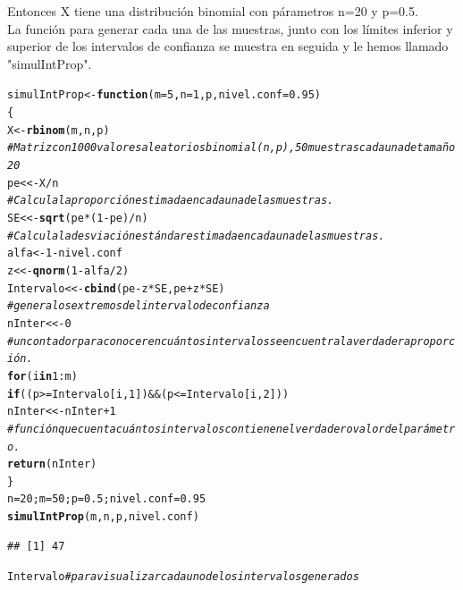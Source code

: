 \documentclass[12pt,letterpaper]{article}\usepackage[]{graphicx}\usepackage[]{color}
\makeatletter
\newcommand{\hlnum}[1]{\textcolor[rgb]{0.686,0.059,0.569}{#1}}%
\newcommand{\hlcom}[1]{\textcolor[rgb]{0.678,0.584,0.686}{\textit{#1}}}%
\newcommand{\hlopt}[1]{\textcolor[rgb]{0,0,0}{#1}}%
\newcommand{\hlstd}[1]{\textcolor[rgb]{0.345,0.345,0.345}{#1}}%
\newcommand{\hlkwa}[1]{\textcolor[rgb]{0.161,0.373,0.58}{\textbf{#1}}}%
\newcommand{\hlkwb}[1]{\textcolor[rgb]{0.69,0.353,0.396}{#1}}%
\newcommand{\hlkwc}[1]{\textcolor[rgb]{0.333,0.667,0.333}{#1}}%
\newcommand{\hlkwd}[1]{\textcolor[rgb]{0.737,0.353,0.396}{\textbf{#1}}}%
\newenvironment{kframe}{%
 \def\at@end@of@kframe{}%
 \ifinner\ifhmode%
  \def\at@end@of@kframe{\end{minipage}}%
  \begin{minipage}{\columnwidth}%
 \fi\fi%
 \def\FrameCommand##1{\hskip\@totalleftmargin \hskip-\fboxsep
 \colorbox{shadecolor}{##1}\hskip-\fboxsep
     \hskip-\linewidth \hskip-\@totalleftmargin \hskip\columnwidth}%
 \MakeFramed {\advance\hsize-\width
   \@totalleftmargin\z@ \linewidth\hsize
   \@setminipage}}%
 {\par\unskip\endMakeFramed%
 \at@end@of@kframe}
\newenvironment{knitrout}{}{} %
\makeatother
\begin{document}
Entonces X tiene una distribuci\'on binomial con p\'arametros n=20 y p=0.5.\\

La funci\'on para generar cada una de las muestras, junto con los l\'imites inferior y superior de los intervalos de confianza se muestra en seguida y le hemos llamado "simulIntProp". 
\begin{knitrout}
\color{fgcolor}\begin{kframe}
\begin{alltt}
\hlstd{simulIntProp} \hlkwb{<-} \hlkwa{function}\hlstd{(}\hlkwc{m}\hlstd{=}\hlnum{5}\hlstd{,} \hlkwc{n}\hlstd{=}\hlnum{1}\hlstd{,} \hlkwc{p}\hlstd{,} \hlkwc{nivel.conf}\hlstd{=}\hlnum{0.95}\hlstd{)}
\hlstd{\{}
\hlstd{X} \hlkwb{<-} \hlkwd{rbinom}\hlstd{(m, n, p)}
\hlcom{# Matriz con 1000 valores aleatorios binomial(n,p), 50 muestras cada una de tamaño 20 }
\hlstd{pe} \hlkwb{<<-} \hlstd{X}\hlopt{/}\hlstd{n}
 \hlcom{# Calcula la proporción estimada en cada una de las muestras. }
\hlstd{SE} \hlkwb{<<-} \hlkwd{sqrt}\hlstd{(pe}\hlopt{*}\hlstd{(}\hlnum{1}\hlopt{-}\hlstd{pe)}\hlopt{/}\hlstd{n)}
\hlcom{# Calcula la desviación estándar estimada en cada una de las muestras. }
\hlstd{alfa} \hlkwb{<-} \hlnum{1}\hlopt{-}\hlstd{nivel.conf}
\hlstd{z} \hlkwb{<<-} \hlkwd{qnorm}\hlstd{(}\hlnum{1}\hlopt{-}\hlstd{alfa}\hlopt{/}\hlnum{2}\hlstd{)}
\hlstd{Intervalo} \hlkwb{<<-} \hlkwd{cbind}\hlstd{(pe} \hlopt{-} \hlstd{z}\hlopt{*}\hlstd{SE, pe} \hlopt{+} \hlstd{z}\hlopt{*}\hlstd{SE)}
\hlcom{# genera los extremos del intervalo de confianza }
\hlstd{nInter} \hlkwb{<<-} \hlnum{0}
\hlcom{# un contador para conocer en cuántos intervalos se encuentra la verdadera proporción. }
\hlkwa{for}\hlstd{(i} \hlkwa{in} \hlnum{1}\hlopt{:}\hlstd{m)}
\hlkwa{if} \hlstd{((p} \hlopt{>=} \hlstd{Intervalo[i,} \hlnum{1}\hlstd{])} \hlopt{&&} \hlstd{(p} \hlopt{<=} \hlstd{Intervalo[i,} \hlnum{2}\hlstd{]))}
\hlstd{nInter} \hlkwb{<<-} \hlstd{nInter} \hlopt{+} \hlnum{1}
\hlcom{# función que cuenta cuántos intervalos contienen el verdadero valor del parámetro. }
\hlkwd{return}\hlstd{(nInter)}
\hlstd{\}}
\hlstd{n}\hlkwb{=}\hlnum{20}\hlstd{; m}\hlkwb{=} \hlnum{50}\hlstd{; p}\hlkwb{=}\hlnum{0.5}\hlstd{; nivel.conf}\hlkwb{=}\hlnum{0.95}
\hlkwd{simulIntProp}\hlstd{(m, n, p, nivel.conf)}
\end{alltt}
\begin{verbatim}
## [1] 47
\end{verbatim}
\begin{alltt}
\hlstd{Intervalo} \hlcom{# para visualizar cada uno de los intervalos generados }

\end{alltt}
\end{kframe}
\end{knitrout}
\end{document}
